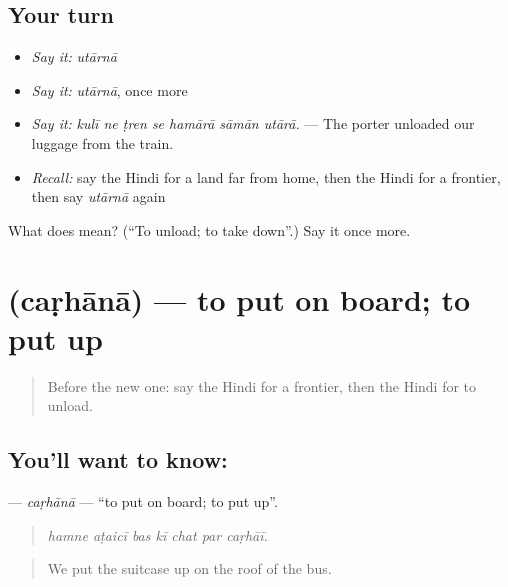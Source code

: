 \subsection*{Your turn}
\begin{itemize}
\raggedright
  \item \emph{Say it:} \emph{utārnā}
  \item \emph{Say it:} \emph{utārnā}, once more
  \item \emph{Say it:} \emph{kulī ne ṭren se hamārā sāmān utārā.} — The porter unloaded our luggage from the train.
  \item \emph{Recall:} say the Hindi for a land far from home, then the Hindi for a frontier, then say \emph{utārnā} again
\end{itemize}

\begin{tcolorbox}[breakable,colback=teal!4,colframe=teal!35!black,title={Before you move on}]
What does  mean? (\textquotedblleft{}To unload; to take down\textquotedblright{}.) Say it once more.
\end{tcolorbox}
\section[\texorpdfstring{\hi{चढ़ाना} (caṛhānā)}{चढ़ाना (caṛhānā)}]{ (caṛhānā) — to put on board; to put up}

\label{lesson:HI-C412-carhana}



\begin{quote}
Before the new one: say the Hindi for a frontier, then the Hindi for to unload.
\end{quote}

\subsection*{You'll want to know: }
\textbf{} — \emph{caṛhānā} — \textquotedblleft{}to put on board; to put up\textquotedblright{}.

\begin{quote}
      
\end{quote}

\begin{quote}
\emph{hamne aṭaicī bas kī chat par caṛhāī.}
\end{quote}

\begin{quote}
We put the suitcase up on the roof of the bus.
\end{quote}

